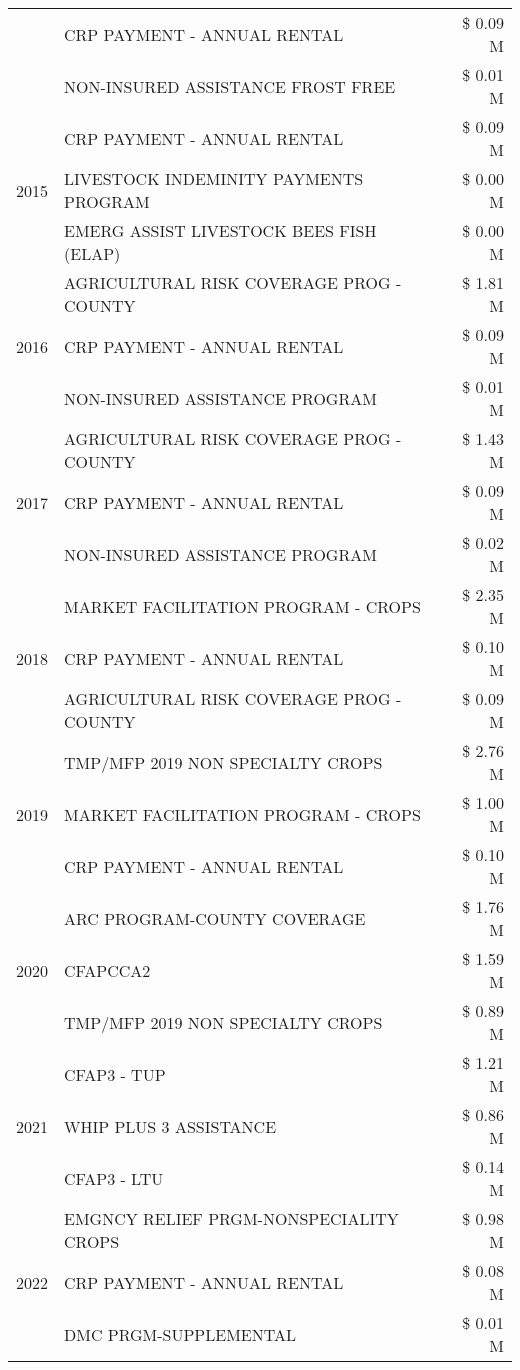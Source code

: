 \begin{tabular}{llr}
 & CRP PAYMENT - ANNUAL RENTAL & \$ 0.09 M \\
 & NON-INSURED ASSISTANCE FROST FREE & \$ 0.01 M \\
\cline{1-3}
\multirow[t]{3}{*}{2015} & CRP PAYMENT - ANNUAL RENTAL & \$ 0.09 M \\
 & LIVESTOCK INDEMINITY PAYMENTS PROGRAM & \$ 0.00 M \\
 & EMERG ASSIST LIVESTOCK BEES FISH (ELAP) & \$ 0.00 M \\
\cline{1-3}
\multirow[t]{3}{*}{2016} & AGRICULTURAL RISK COVERAGE PROG - COUNTY & \$ 1.81 M \\
 & CRP PAYMENT - ANNUAL RENTAL & \$ 0.09 M \\
 & NON-INSURED ASSISTANCE PROGRAM & \$ 0.01 M \\
\cline{1-3}
\multirow[t]{3}{*}{2017} & AGRICULTURAL RISK COVERAGE PROG - COUNTY & \$ 1.43 M \\
 & CRP PAYMENT - ANNUAL RENTAL & \$ 0.09 M \\
 & NON-INSURED ASSISTANCE PROGRAM & \$ 0.02 M \\
\cline{1-3}
\multirow[t]{3}{*}{2018} & MARKET FACILITATION PROGRAM - CROPS & \$ 2.35 M \\
 & CRP PAYMENT - ANNUAL RENTAL & \$ 0.10 M \\
 & AGRICULTURAL RISK COVERAGE PROG - COUNTY & \$ 0.09 M \\
\cline{1-3}
\multirow[t]{3}{*}{2019} & TMP/MFP 2019 NON SPECIALTY CROPS & \$ 2.76 M \\
 & MARKET FACILITATION PROGRAM - CROPS & \$ 1.00 M \\
 & CRP PAYMENT - ANNUAL RENTAL & \$ 0.10 M \\
\cline{1-3}
\multirow[t]{3}{*}{2020} & ARC PROGRAM-COUNTY COVERAGE & \$ 1.76 M \\
 & CFAPCCA2 & \$ 1.59 M \\
 & TMP/MFP 2019 NON SPECIALTY CROPS & \$ 0.89 M \\
\cline{1-3}
\multirow[t]{3}{*}{2021} & CFAP3 - TUP & \$ 1.21 M \\
 & WHIP PLUS 3 ASSISTANCE & \$ 0.86 M \\
 & CFAP3 - LTU & \$ 0.14 M \\
\cline{1-3}
\multirow[t]{3}{*}{2022} & EMGNCY RELIEF PRGM-NONSPECIALITY CROPS & \$ 0.98 M \\
 & CRP PAYMENT - ANNUAL RENTAL & \$ 0.08 M \\
 & DMC PRGM-SUPPLEMENTAL & \$ 0.01 M \\
\cline{1-3}
\bottomrule
\end{tabular}
